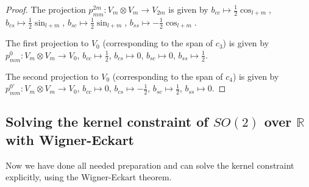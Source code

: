 \documentclass[12pt, a4paper]{article}
\theoremstyle{plain}
\theoremstyle{definition}
\theoremstyle{remark}
\newcommand{\R}{\mathds{R}}
\begin{document}
\begin{proof}
The projection $p_{mm}^{2m}: V_m \otimes V_m \to V_{2m}$ is given by $b_{cc} \mapsto \frac{1}{2} \cos_{l+m}$, $b_{cs} \mapsto \frac{1}{2} \sin_{l+m}$, $b_{sc} \mapsto \frac{1}{2} \sin_{l+m}$, $b_{ss} \mapsto -\frac{1}{2} \cos_{l+m}$.

The first projection to $V_0$ (corresponding to the span of $c_3$) is given by $p_{mm}^{0}: V_m \otimes V_m \to V_0$, $b_{cc} \mapsto \frac{1}{2}$, $b_{cs} \mapsto 0$, $b_{sc} \mapsto 0$, $b_{ss} \mapsto \frac{1}{2}$.

The second projection to $V_0$ (corresponding to the span of $c_4$) is given by $p_{mm}^{0'}: V_m \otimes V_m \to V_0$, $b_{cc} \mapsto 0$, $b_{cs} \mapsto - \frac{1}{2}$, $b_{sc} \mapsto \frac{1}{2}$, $b_{ss} \mapsto 0$.
\end{proof}



\subsection{Solving the kernel constraint of $SO(2)$ over $\R$ with Wigner-Eckart}

Now we have done all needed preparation and can solve the kernel constraint explicitly, using the Wigner-Eckart theorem.
\end{document}
